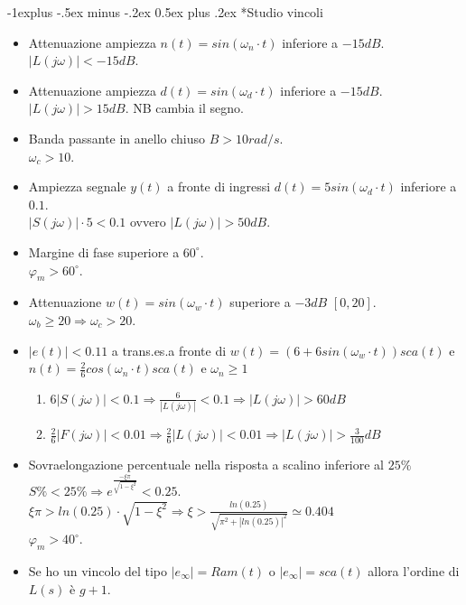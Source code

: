 \documentclass[10pt,landscape, a4paper]{scrartcl} %
\makeatletter
\renewcommand{\subsection}{\@startsection{subsection}{2}{0mm}%
                                {-1explus -.5ex minus -.2ex}%
                                {0.5ex plus .2ex}%
                                {\normalfont\normalsize\bfseries}}
\makeatother
\begin{document}
\begin{multicols*}{3}
\subsection*{Studio vincoli}
\begin{itemize}
	\item Attenuazione ampiezza $n(t) = sin(\omega_n\cdot t)$ inferiore a $-15 dB$.\\
		$|L(j\omega)| < -15 dB$.
	\item Attenuazione ampiezza $d(t) = sin(\omega_d\cdot t)$ inferiore a $-15 dB$.\\
		$|L(j\omega)| > 15 dB$. NB cambia il segno.
	\item Banda passante in anello chiuso $B > 10 rad/s$.\\
		$\omega_c > 10$.
	\item Ampiezza segnale $y(t)$ a fronte di ingressi $d(t) = 5sin(\omega_d \cdot t)$ inferiore a $0.1$.\\
		$|S(j\omega)| \cdot 5 < 0.1$ ovvero $|L(j\omega)| > 50 dB$.
	\item Margine di fase superiore a $60^{\circ}$.\\
		$\varphi_m > 60^{\circ}$.
	\item Attenuazione $w(t) = sin (\omega_w \cdot t)$ superiore a $-3 dB$ $[0,20]$.\\
		$\omega_b \geq 20 \Rightarrow \omega_c > 20$.
	\item $|e(t)| < 0.11$ a trans.es.a fronte di $w(t) = (6 + 6sin(\omega_w \cdot t)) sca(t)$ e $n(t) = \frac{2}{6} cos(\omega_n \cdot t) sca(t)$ e $\omega_n \geq 1$
		\begin{enumerate}
			\item $6|S(j\omega)| < 0.1 \Rightarrow \frac{6}{|L(j\omega)|} < 0.1 \Rightarrow |L(j\omega)| > 60 dB$
			\item $\frac{2}{6}|F(j\omega)| < 0.01 \Rightarrow \frac{2}{6}|L(j\omega)| < 0.01 \Rightarrow |L(j\omega)| > \frac{3}{100} dB$
		\end{enumerate}		
	\item Sovraelongazione percentuale nella risposta a scalino inferiore al $25\%$\\
		$S\% < 25\% \Rightarrow e^{\frac{-\xi \pi}{\sqrt{1 - \xi^2}}} < 0.25$.\\
		$\xi \pi > ln(0.25) \cdot \sqrt{1 - \xi^2} \Rightarrow \xi > \frac{ln(0.25)}{\sqrt{\pi^2 + |ln(0.25)|^2}} \simeq 0.404$\\
		$\varphi_m > 40^{\circ}$.
	\item Se ho un vincolo del tipo $|e_\infty| = Ram(t)$ o $|e_\infty| = sca(t)$ allora l'ordine di $L(s)$ è $g+1$. 

\end{itemize}
\end{multicols*}
\end{document}
